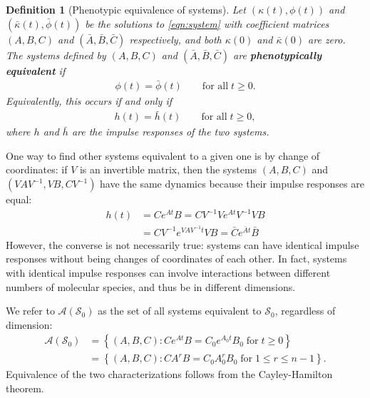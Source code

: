 \documentclass{article}
\newcommand{\calA}{\mathcal{A}}
\newcommand{\1}{\mathbbm{1}}
\newcommand{\Sys}{\mathcal{S}}
\newtheorem{definition}{Definition}
\begin{document}
\begin{definition}[Phenotypic equivalence of systems]
    Let $(\kappa(t),\phi(t))$ and $(\bar \kappa(t),\bar \phi(t))$ be the solutions to \eqref{eqn:system}
    with coefficient matrices $(A,B,C)$ and $(\bar A,\bar B,\bar C)$ respectively,
    and both $\kappa(0)$ and $\bar \kappa(0)$ are zero. 
    The systems defined by $(A,B,C)$ and $(\bar A,\bar B,\bar C)$ are
    \textbf{phenotypically equivalent} 
    if
    \begin{align*}
        \phi(t) = \bar \phi(t) \qquad \text{for all} \; t \ge 0.
    \end{align*}
    Equivalently, this occurs if and only if
    \begin{align*}
        h(t) = \bar h(t)  \qquad \text{for all} \; t \ge 0,
    \end{align*}
    where $h$ and $\bar h$ are the impulse responses of the two systems.
\end{definition}

One way to find other systems equivalent to a given one
is by change of coordinates:
if $V$ is an invertible matrix, then the systems $(A,B,C)$ and $(VAV^{-1},VB,CV^{-1})$
have the same dynamics because their impulse responses are equal:
  \begin{equation}
    \begin{aligned}
      h(t) &= C e^{A t} B 
      = C V^{-1} V e^{A t} V^{-1} V B \\
      &= C V^{-1} e^{V A V^{-1} t} V B 
      = \bar{C} e^{\bar{A} t} \bar{B}
    \end{aligned}
  \end{equation}
However, the converse is not necessarily true: 
systems can have identical impulse responses without being changes of coordinates of each other.
In fact, systems with identical impulse responses can involve interactions between different
numbers of molecular species, and thus be in different dimensions.

We refer to $\calA(\Sys_0)$ as the set of all systems equivalent to $\Sys_0$, regardless of dimension:
\begin{equation} \label{eqn:equivalence}
  \begin{aligned}
    \calA(\Sys_0) 
      &= \left\{
        (A,B,C) : C e^{At} B = C_0 e^{A_0 t} B_0 \; \text{for}\; t \ge 0 
      \right\}  \\
      &= \left\{
        (A,B,C) : C A^r B = C_0 A_0^r B_0 \; \text{for}\; 1 \le r \le n-1 
      \right\} .
  \end{aligned}
\end{equation}
Equivalence of the two characterizations follows from the Cayley-Hamilton theorem.
\end{document}
